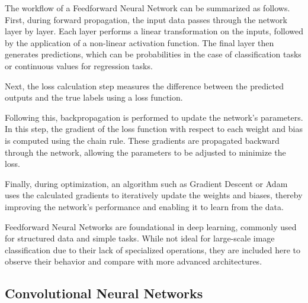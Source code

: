 The workflow of a Feedforward Neural Network can be summarized as follows. First, during forward propagation, the input data passes through the network layer by layer. Each layer performs a linear transformation on the inputs, followed by the application of a non-linear activation function. The final layer then generates predictions, which can be probabilities in the case of classification tasks or continuous values for regression tasks.

Next, the loss calculation step measures the difference between the predicted outputs and the true labels using a loss function. 

Following this, backpropagation is performed to update the network's parameters. In this step, the gradient of the loss function with respect to each weight and bias is computed using the chain rule. These gradients are propagated backward through the network, allowing the parameters to be adjusted to minimize the loss.

Finally, during optimization, an algorithm such as Gradient Descent or Adam uses the calculated gradients to iteratively update the weights and biases, thereby improving the network's performance and enabling it to learn from the data.

Feedforward Neural Networks are foundational in deep learning, commonly used for structured data and simple tasks. While not ideal for large-scale image classification due to their lack of specialized operations, they are included here to observe their behavior and compare with more advanced architectures.

\subsection{Convolutional Neural Networks}


